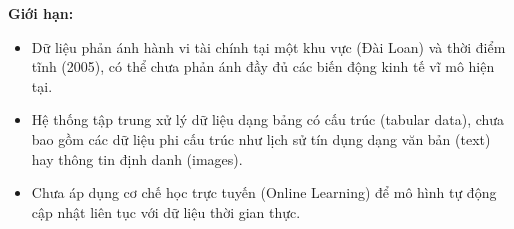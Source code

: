 \textbf{Giới hạn:}
\begin{itemize}
    \item Dữ liệu phản ánh hành vi tài chính tại một khu vực (Đài Loan) và thời điểm tĩnh (2005), có thể chưa phản ánh đầy đủ các biến động kinh tế vĩ mô hiện tại.
    \item Hệ thống tập trung xử lý dữ liệu dạng bảng có cấu trúc (tabular data), chưa bao gồm các dữ liệu phi cấu trúc như lịch sử tín dụng dạng văn bản (text) hay thông tin định danh (images).
    \item Chưa áp dụng cơ chế học trực tuyến (Online Learning) để mô hình tự động cập nhật liên tục với dữ liệu thời gian thực.
\end{itemize}
